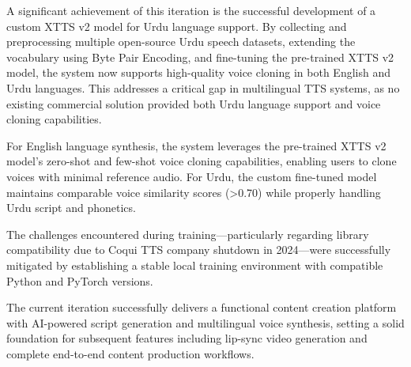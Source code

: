 A significant achievement of this iteration is the successful development of a custom XTTS v2 model for Urdu language support. By collecting and preprocessing multiple open-source Urdu speech datasets, extending the vocabulary using Byte Pair Encoding, and fine-tuning the pre-trained XTTS v2 model, the system now supports high-quality voice cloning in both English and Urdu languages. This addresses a critical gap in multilingual TTS systems, as no existing commercial solution provided both Urdu language support and voice cloning capabilities.

For English language synthesis, the system leverages the pre-trained XTTS v2 model's zero-shot and few-shot voice cloning capabilities, enabling users to clone voices with minimal reference audio. For Urdu, the custom fine-tuned model maintains comparable voice similarity scores (>0.70) while properly handling Urdu script and phonetics.

The challenges encountered during training—particularly regarding library compatibility due to Coqui TTS company shutdown in 2024—were successfully mitigated by establishing a stable local training environment with compatible Python and PyTorch versions.

The current iteration successfully delivers a functional content creation platform with AI-powered script generation and multilingual voice synthesis, setting a solid foundation for subsequent features including lip-sync video generation and complete end-to-end content production workflows.

